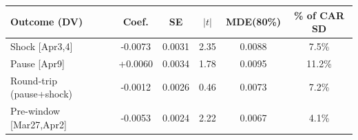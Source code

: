 \begin{tabular}{lccccc}
\toprule
Outcome (DV) & Coef. & SE & $|t|$ & MDE(80\%) & \% of CAR SD \\
\midrule
Shock [Apr3,4] & -0.0073 & 0.0031 & 2.35 & 0.0088 & 7.5\% \\
Pause [Apr9] & +0.0060 & 0.0034 & 1.78 & 0.0095 & 11.2\% \\
Round-trip (pause+shock) & -0.0012 & 0.0026 & 0.46 & 0.0073 & 7.2\% \\
Pre-window [Mar27,Apr2] & -0.0053 & 0.0024 & 2.22 & 0.0067 & 4.1\% \\
\bottomrule
\end{tabular}